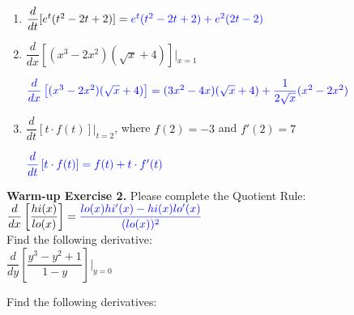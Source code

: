 \documentclass[10pt]{article}
\begin{document}
\begin{enumerate}[label=(\alph*)]
\item$\dfrac{d}{dt}[e^t(t^2-2t+2)]={\color{blue}e^t(t^2-2t+2)+e^2(2t-2)}$

\vfill

\item $\dfrac{d}{dx}[(x^3-2x^2)(\sqrt{x}+4)]\bigg|_{x=1}$

${\color{blue}\dfrac{d}{dx}\left[(x^3-2x^2)(\sqrt{x}+4)\right]=(3x^2-4x)(\sqrt{x}+4)+\dfrac{1}{2\sqrt{x}}(x^2-2x^2)}$


\vfill
\vfill

\item $\dfrac{d}{dt}\left[ t\cdot f(t) \right]\bigg|_{t=2}$, where $f(2)=-3$ and $f'(2)=7$

${\color{blue}\dfrac{d}{dt}\left[ t\cdot f(t) \right]=f(t)+t\cdot f'(t)}$


\vfill
\vfill

\end{enumerate}
\newpage

{\bf\color{blue}Warm-up Exercise 2.} Please complete the Quotient Rule: $\dfrac{d}{dx}\left[ \dfrac{hi(x)}{lo(x)} \right] ={\color{blue}\dfrac{lo(x)hi'(x)-hi(x)lo'(x)}{(lo(x))^2}}$ \\

{} Find the following derivative:\\

$\dfrac{d}{dy}\left[ \dfrac{y^3-y^2+1}{1-y} \right]\bigg|_{y=0}$


\vfill

{} Find the following derivatives:\\
\end{document}
